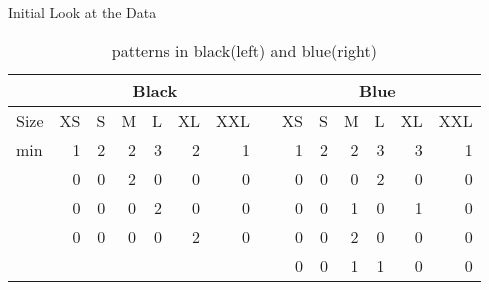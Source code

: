 \begin{frame}{Initial Look at the Data}
\begin{minipage}{\textwidth}
\begin{table}[htbp]
	\begin{center}
		\begin{tabular}{|l|r|r|r|r|r|r|l|r|r|r|r|r|r|}
			\hline
			& \multicolumn{6}{|c|}{Black} & \multicolumn{1}{|c|}{} & \multicolumn{6}{|c|}{Blue} \\ \hline
			Size & \multicolumn{1}{l|}{XS} & \multicolumn{1}{l|}{S} & \multicolumn{1}{l|}{M} & \multicolumn{1}{l|}{L} & \multicolumn{1}{l|}{XL} & \multicolumn{1}{l|}{XXL}& \multicolumn{1}{|c|}{} & \multicolumn{1}{l|}{XS} & \multicolumn{1}{l|}{S} &  \multicolumn{1}{l|}{M} & \multicolumn{1}{l|}{L} & \multicolumn{1}{l|}{XL} & \multicolumn{1}{l|}{XXL} \\ \hline 
			min  & 1 & 2 & 2 & 3 & 2 & 1 &  & 1 & 2 & 2 & 3 & 3 & 1 \\ \hline
			& 0 & 0 & 2 & 0 & 0 & 0 &  & 0 & 0 & 0 & 2 & 0 & 0 \\ \hline
			& 0 & 0 & 0 & 2 & 0 & 0 &  & 0 & 0 & 1 & 0 & 1 & 0 \\ \hline
			& 0 & 0 & 0 & 0 & 2 & 0 &  & 0 & 0 & 2 & 0 & 0 & 0 \\ \hline
			& \multicolumn{1}{l|}{} & \multicolumn{1}{l|}{} & \multicolumn{1}{l|}{} & \multicolumn{1}{l|}{} & \multicolumn{1}{l|}{} & \multicolumn{1}{l|}{} &  & 0 & 0 & 1 & 1 & 0 & 0 \\ \hline
		\end{tabular}
	\end{center}
	\caption{patterns in black(left) and blue(right)}
	\label{}
\end{table}\vspace{-3ex}
\end{minipage}
\begin{minipage}{\textwidth}
	

\end{minipage}
\end{frame}
